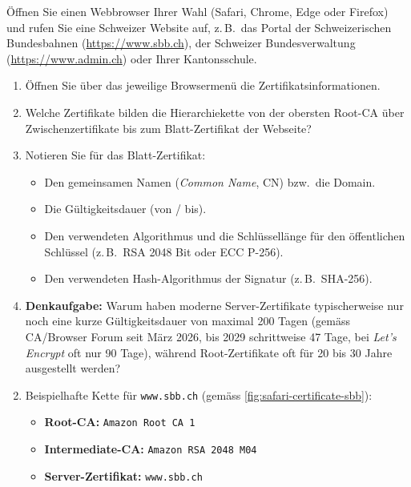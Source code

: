 \begin{myexercise}
	Öffnen Sie einen Webbrowser Ihrer Wahl (Safari, Chrome, Edge oder Firefox) und rufen Sie eine Schweizer Website auf, z.\,B.\ das Portal der Schweizerischen Bundesbahnen (\url{https://www.sbb.ch}), der Schweizer Bundesverwaltung (\url{https://www.admin.ch}) oder Ihrer Kantonsschule.

	\begin{enumerate}
		\item Öffnen Sie über das jeweilige Browsermenü die Zertifikatsinformationen.
		\item Welche Zertifikate bilden die Hierarchiekette von der obersten Root-\gls{CA} über Zwischenzertifikate bis zum Blatt-Zertifikat der Webseite?
		\item Notieren Sie für das Blatt-Zertifikat:
		      \begin{itemize}
			      \item Den gemeinsamen Namen (\emph{Common Name}, \acrshort{CN}) bzw.\ die Domain.
			      \item Die Gültigkeitsdauer (von / bis).
			      \item Den verwendeten Algorithmus und die Schlüssellänge für den öffentlichen Schlüssel (z.\,B.\ \gls{RSA} 2048 Bit oder \gls{ECC} P-256).
			      \item Den verwendeten Hash-Algorithmus der Signatur (z.\,B.\ \acrshort{SHA}-256).
		      \end{itemize}
		\item \textbf{Denkaufgabe:} Warum haben moderne Server-Zertifikate typischerweise nur noch eine kurze Gültigkeitsdauer von maximal 200 Tagen (gemäss CA/Browser Forum seit März 2026, bis 2029 schrittweise 47 Tage, bei \emph{Let's Encrypt} oft nur 90 Tage), während Root-Zertifikate oft für 20 bis 30 Jahre ausgestellt werden?
	\end{enumerate}
	\begin{myanswer}
		\begin{enumerate}
			\setcounter{enumi}{1}
			\item Beispielhafte Kette für \texttt{www.sbb.ch} (gemäss \cref{fig:safari-certificate-sbb}):
			      \begin{itemize}
				      \item \textbf{Root-\gls{CA}:} \texttt{Amazon Root CA 1}
				      \item \textbf{Intermediate-\gls{CA}:} \texttt{Amazon RSA 2048 M04}
				      \item \textbf{Server-Zertifikat:} \texttt{www.sbb.ch}

\end{itemize}
\end{enumerate}
\end{myanswer}
\end{myexercise}
